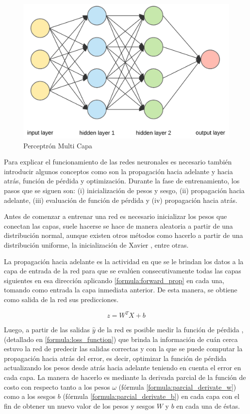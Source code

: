  
 \begin{figure}[!h]
 	\centering
 	\includegraphics[width=0.7\linewidth]{images/red_neuronal}
 	\caption[Ejemplo red neuronal]{Perceptrón Multi Capa}
 	\label{fig:redneuronal}
 \end{figure}
 Para explicar el funcionamiento de las redes neuronales es necesario también introducir algunos conceptos como son la propagación hacia adelante y hacia atrás, función de pérdida y optimización. Durante la fase de entrenamiento, los pasos que se siguen son:
 (i) inicialización de pesos y sesgo, (ii) propagación hacia adelante, (iii) evaluación de función de pérdida y (iv) propagación hacia atrás.
 
 Antes de comenzar a entrenar una red es necesario inicializar los pesos que conectan las capas, suele hacerse se hace de manera aleatoria a partir de una distribución normal, aunque existen otros métodos como hacerlo a partir de una distribución uniforme, la inicialización de Xavier \cite{glorot2010understanding}, entre otras.
 
 La propagación hacia adelante \cite{russell2016artificial} es la actividad en que se le brindan los datos a la capa de entrada de la red para que se evalúen consecutivamente todas las capas siguientes en esa dirección aplicando \ref{formula:forward_prop} en cada una, tomando como entrada la capa inmediata anterior. De esta manera, se obtiene como salida de la red sus predicciones. 
 
 \begin{equation}\label{formula:forward_prop}
 z=W^{T} X+b
 \end{equation}
 
 Luego, a partir de las salidas \(\hat{y}\) de la red es posible medir la función de pérdida \cite{russell2016artificial}, \cite{zhao2016loss} (detallado en \ref{formula:loss_function}) que brinda la información de cuán cerca estuvo la red de predecir las salidas correctas y con la que se puede computar la propagación hacia atrás del error, es decir, optimizar la función de pérdida actualizando los pesos desde atrás hacia adelante teniendo en cuenta el error en cada capa. La manera de hacerlo es mediante la derivada parcial de la función de costo con respecto tanto a los pesos \(\omega\) (fórmula \ref{formula:parcial_derivate_w}) como a los sesgos \(b\) (fórmula \ref{formula:parcial_derivate_b}) en cada capa con el fin de obtener un nuevo valor de los pesos y sesgos \(W\) y \(b\) en cada una de éstas.
  
